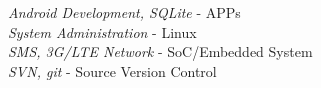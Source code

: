\documentclass[10pt]{article} %
\begin{document}

{
\textit{Android Development, SQLite} - APPs\\
\textit{System Administration} - Linux\\
\textit{SMS, 3G/LTE Network} - SoC/Embedded System\\
\textit{SVN, git} - Source Version Control
}






\end{document}
